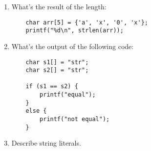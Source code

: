 \documentclass{article}
\begin{document}
\begin{enumerate}
    \item What’s the result of the length:
    \begin{lstlisting}
    char arr[5] = {'a', 'x', '0', 'x'};
    printf("%d\n", strlen(arr));
    \end{lstlisting}
    \vspace{16mm}
    \item What’s the output of the following code:
    \begin{lstlisting}
    char s1[] = "str";
    char s2[] = "str";
    
    if (s1 == s2) {
        printf("equal");
    }
    else {
        printf("not equal");
    }
    \end{lstlisting}
    \vspace{16mm}
    \item Describe string literals.
    \vspace{16mm}


\end{enumerate}
\end{document}
